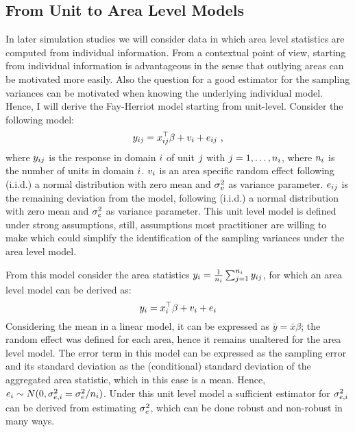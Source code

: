 \subsection{From Unit to Area Level
Models}\label{from-unit-to-area-level-models}

In later simulation studies we will consider data in which area level
statistics are computed from individual information. From a contextual
point of view, starting from individual information is advantageous in
the sense that outlying areas can be motivated more easily. Also the
question for a good estimator for the sampling variances can be
motivated when knowing the underlying individual model. Hence, I will
derive the Fay-Herriot model starting from unit-level. Consider the
following model: \[
y_{ij} = x_{ij}^\top\beta + v_{i} + e_{ij} \text{ ,}
\] where $y_{ij}$ is the response in domain
$i$ of unit $j$ with
$j = 1, \dots, n_i$, where $n_i$ is the
number of units in domain $i$. $v_{i}$ is an
area specific random effect following (i.i.d.) a normal distribution
with zero mean and $\sigma_v^2$ as variance parameter.
$e_{ij}$ is the remaining deviation from the model,
following (i.i.d.) a normal distribution with zero mean and
$\sigma_e^2$ as variance parameter. This unit level model is
defined under strong assumptions, still, assumptions most practitioner
are willing to make which could simplify the identification of the
sampling variances under the area level model.

From this model consider the area statistics
$y_{i} = \frac{1}{n_i} \sum_{j = 1}^{n_i}y_{ij}$,
for which an area level model can be derived as: \[
y_{i} = x_{i}^\top\beta + v_{i} + e_{i}
\] Considering the mean in a linear model, it can be expressed as
$\bar{y} = \bar{x}\beta$; the random effect was defined for each area,
hence it remains unaltered for the area level model. The error term in
this model can be expressed as the sampling error and its standard
deviation as the (conditional) standard deviation of the aggregated area
statistic, which in this case is a mean. Hence,
$e_{i} \sim N(0, \sigma_{e, i}^2 = \sigma_e^2 / n_i)$.
Under this unit level model a sufficient estimator for
$\sigma_{e, i}^2$ can be derived from estimating
$\sigma_e^2$, which can be done robust and non-robust in many
ways.
